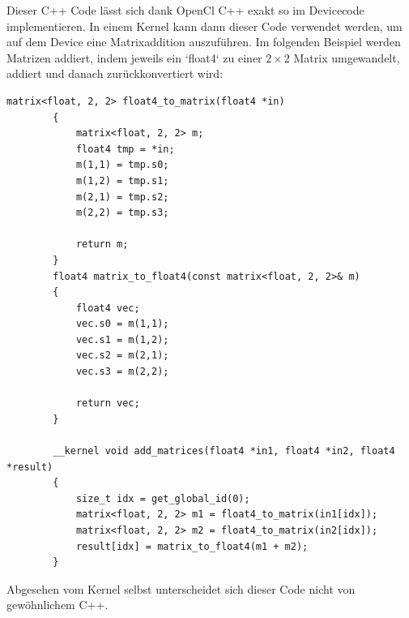 	    Dieser C++ Code lässt sich dank OpenCl C++ exakt so im Devicecode implementieren. In einem \Gls{Kernel} kann dann dieser Code verwendet werden, um auf dem Device eine Matrixaddition auszuführen. Im folgenden Beispiel werden Matrizen addiert, indem jeweils ein \li`float4` zu einer $2\times 2$ Matrix umgewandelt, addiert und danach zurückkonvertiert wird:	
        \begin{lstlisting}[caption=OpenCl C++ Kernel]
        matrix<float, 2, 2> float4_to_matrix(float4 *in) 
        {
            matrix<float, 2, 2> m;
            float4 tmp = *in;
            m(1,1) = tmp.s0;
            m(1,2) = tmp.s1;
            m(2,1) = tmp.s2;
            m(2,2) = tmp.s3;
			
            return m;
        }
        float4 matrix_to_float4(const matrix<float, 2, 2>& m)
        {
            float4 vec;
            vec.s0 = m(1,1);
            vec.s1 = m(1,2);
            vec.s2 = m(2,1);
            vec.s3 = m(2,2);

            return vec;
        }

        __kernel void add_matrices(float4 *in1, float4 *in2, float4 *result) 
        {
            size_t idx = get_global_id(0);
            matrix<float, 2, 2> m1 = float4_to_matrix(in1[idx]);
            matrix<float, 2, 2> m2 = float4_to_matrix(in2[idx]);
            result[idx] = matrix_to_float4(m1 + m2);
        }
        \end{lstlisting}
		
		Abgesehen vom \Gls{Kernel} selbst unterscheidet sich dieser Code nicht von gewöhnlichem C++.
		
		\newpage
